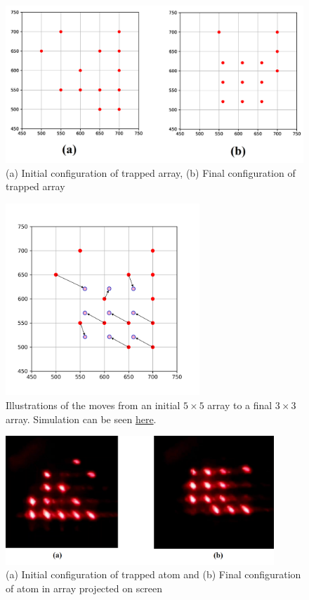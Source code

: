 \begin{figure}[H]
\label{fig:tweezers_plot}
\centering
\includegraphics[width=\textwidth]{img/tweezers_plot.png}
\caption{(a) Initial configuration of trapped array, (b) Final configuration of trapped array}
\end{figure}

\begin{figure}[H]
\label{fig:combined_move}
\centering
\includegraphics[width=0.65\textwidth]{img/combined_move.png}
\caption{Illustrations of the moves from an initial $5 \times 5$ array to a final $3 \times 3$ array. Simulation can be seen \href{https://drive.google.com/file/d/1JTKyHGn4GLYZHJFvZTr1iKvnrk_kMZGr/view?usp=share_link}{here}.}
\end{figure}

\vspace{0.5cm}
\begin{figure}[H]
\label{trap_slm}
\centering
\includegraphics[width=0.9\textwidth]{img/tweezers.png}
\caption{(a) Initial configuration of trapped atom and (b) Final configuration of atom in array projected on screen}
\end{figure}

